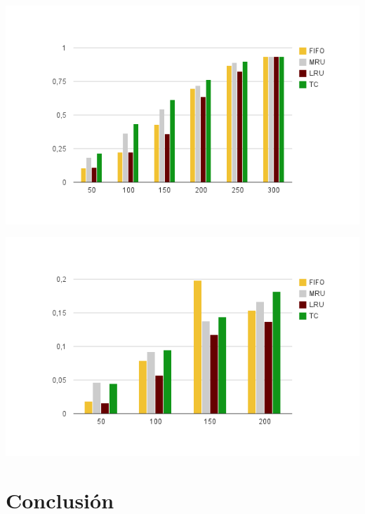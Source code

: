 \includegraphics[scale=.80]{grafico2-2}

\includegraphics[scale=.80]{grafico3}
\section{Conclusión}
